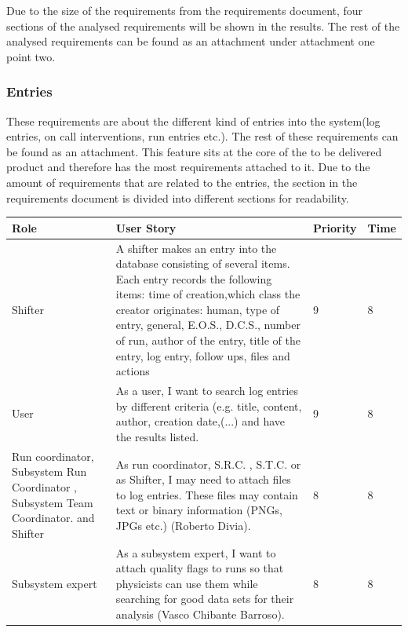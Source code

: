 \documentclass[paper=a4, fontsize=11pt,twoside]{scrartcl}	%
\begin{document}
Due to the size of the requirements from the requirements document, four sections of the analysed requirements will be shown in the results. The rest of the analysed requirements can be found as an attachment under attachment one point two.\\

\subsubsection{Entries}
These requirements are about the different kind of entries into the system(log entries, on call interventions, run entries etc.). The rest of these requirements can be found as an attachment. This feature sits at the core of the to be delivered product and therefore has the most requirements attached to it. Due to the amount of requirements that are related to the entries, the section in the requirements document is divided into different sections for readability.
\newpage
\begin{longtable}{| p{3cm} | p{8cm} | p{1.5cm} | l |}
\hline
Role & User Story & Priority & Time \\ \hline
Shifter &  A shifter makes an entry into the database consisting of several items. Each entry records the following items: time of creation,which class the creator originates: human, type of entry, general, E.O.S., D.C.S., number of run, author of the entry, title of the entry, log entry, follow ups, files and actions & 9 & 8 \\ \hline
User & As a user, I want to search log entries by different criteria (e.g. title, content, author, creation date,(...) and have the results listed. & 9 & 8 \\ \hline
Run coordinator, Subsystem Run Coordinator , Subsystem Team Coordinator. and Shifter& As run coordinator, S.R.C. , S.T.C. or as Shifter, I may need to attach files to log entries. These files may contain text or binary information (PNGs, JPGs etc.) (Roberto Divia). & 8 & 8 \\ \hline
Subsystem expert & As a subsystem expert, I want to attach quality flags to runs so that
physicists can use them while searching for good data sets for their analysis (Vasco Chibante Barroso). & 8 & 8 \\ \hline
\end{longtable}
\end{document}

